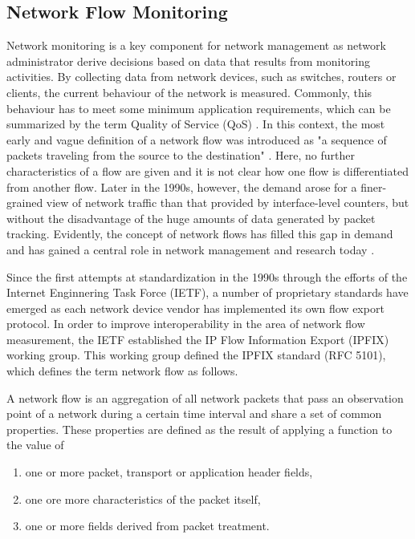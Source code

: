 \subsection{Network Flow Monitoring}

Network monitoring is a key component for network management as network administrator derive decisions based on data that results from monitoring activities. By collecting data from network devices, such as switches, routers or clients, the current behaviour of the network is measured. Commonly, this behaviour has to meet some minimum application requirements, which can be summarized by the term Quality of Service (QoS) \cite[406]{tanenbaum2021computer}. In this context, the most early and vague definition of a network flow was introduced as "a sequence of packets traveling from the source to the destination" \cite{clark1988design}. Here, no further characteristics of a flow are given and it is not clear how one flow is differentiated from another flow. Later in the 1990s, however, the demand arose for a finer-grained view of network traffic than that provided by interface-level counters, but without the disadvantage of the huge amounts of data generated by packet tracking. Evidently, the concept of network flows has filled this gap in demand and has gained a central role in network management and research today \cite{trammell2011introduction}.

Since the first attempts at standardization in the 1990s through the efforts of the Internet Enginnering Task Force (IETF), a number of proprietary standards have emerged as each network device vendor has implemented its own flow export protocol. In order to improve interoperability in the area of network flow measurement, the IETF established the IP Flow Information Export (IPFIX) working group. This working group defined the IPFIX standard (RFC 5101), which defines the term network flow as follows.

A network flow is an aggregation of all network packets that pass an observation point of a network during a certain time interval and share a set of common properties. These properties are defined as the result of applying a function to the value of
\begin{enumerate}
    \item one or more packet, transport or application header fields,
    \item one ore more characteristics of the packet itself,
    \item one or more fields derived from packet treatment.
\end{enumerate}

